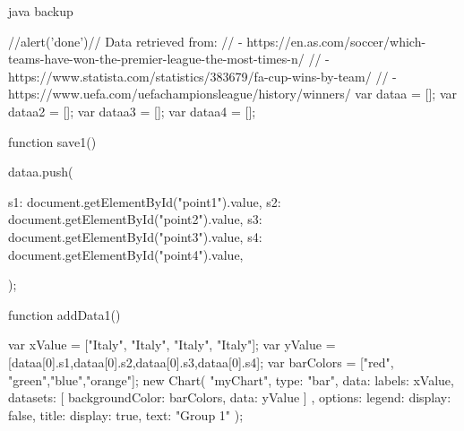 java backup

//alert('done')// Data retrieved from:
// - https://en.as.com/soccer/which-teams-have-won-the-premier-league-the-most-times-n/
// - https://www.statista.com/statistics/383679/fa-cup-wins-by-team/
// - https://www.uefa.com/uefachampionsleague/history/winners/
var dataa  = [];
var dataa2  = [];
var dataa3  = [];
var dataa4  = [];

function save1() {
   dataa.push({
        s1: document.getElementById("point1").value,
        s2: document.getElementById("point2").value,
        s3: document.getElementById("point3").value,
        s4: document.getElementById("point4").value,
       
      });   
}

function addData1() {
       
  var xValue = ["Italy", "Italy", "Italy", "Italy"];
  var yValue = [dataa[0].s1,dataa[0].s2,dataa[0].s3,dataa[0].s4];
  var barColors = ["red", "green","blue","orange"];        
    new Chart( "myChart",
        {
        type: "bar",
        data: {
          labels: xValue,
          datasets: [{
            backgroundColor: barColors,
            data: yValue
          }]
        },
        options: {
          legend: {display: false},
          title: {
            display: true,
            text: "Group 1"
          }
        }
      });
  }


    
    